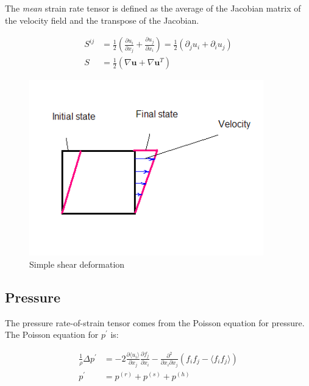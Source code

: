 \documentclass[paper=a4, fontsize=11pt]{scrartcl} %
\numberwithin{equation}{section} %
\numberwithin{figure}{section} %
\numberwithin{table}{section} %
\begin{document}
The \textit{mean} strain rate tensor is defined as the average of the Jacobian matrix of the velocity field 
and the transpose of the Jacobian.

\begin{align}
    S^{ij} &= \frac{1}{2} \left (  \frac{\partial u_i}{\partial x_j} + \frac{\partial u_j}{\partial x_i} \right ) 
            = \frac{1}{2} \left (  \partial_j u_i + \partial_i u_j \right ) \\
    S      &= \frac{1}{2} \left ( \nabla \bm{u} + \nabla \bm{u}^T \right )
\end{align}

\begin{figure}
    \centering
    \includegraphics[width=4in]{../data/Simple_shear.PNG}
    \caption{Simple shear deformation}
    \label{fig:simpleshearstress}
\end{figure}


\subsection{Pressure}

The pressure rate-of-strain tensor comes from the Poisson equation for pressure. The Poisson
equation for $p^{'}$ is:

\begin{align}
    \frac{1}{\rho} \Delta p^{'} &= -2 \frac{ \partial \langle u_i \rangle }{\partial x_j}
            \frac{\partial f_j}{\partial x_i} - \frac{\partial^2}{\partial x_i \partial x_j}
            \left( 
                f_i f_j - \langle f_i f_j \rangle 
            \right ) \\
    p^{'} &= p^{(r)} + p^{(s)} + p^{(h)}
\end{align}
\end{document}
